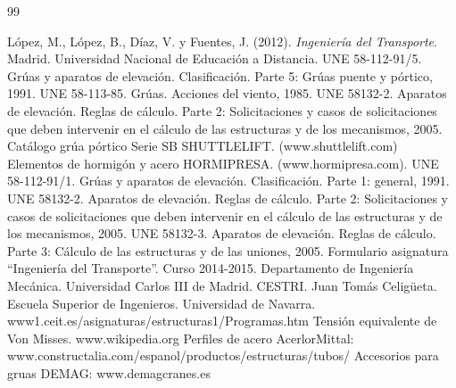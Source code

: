 \documentclass[11pt,oneside,a4paper]{report}
\begin{document}
\begin{thebibliography} {99}

 López, M., López, B., Díaz, V. y Fuentes, J. (2012). \emph{Ingeniería del Transporte}. Madrid. Universidad Nacional de Educación a Distancia.
 UNE 58-112-91/5. Grúas y aparatos de elevación. Clasificación. Parte 5: Grúas puente y pórtico, 1991.
 UNE 58-113-85. Grúas. Acciones del viento, 1985.
 UNE 58132-2. Aparatos de elevación. Reglas de cálculo. Parte 2: Solicitaciones y casos de solicitaciones que deben intervenir en el cálculo de las estructuras y de los mecanismos, 2005.
 Catálogo grúa pórtico Serie SB SHUTTLELIFT. (www.shuttlelift.com)
 Elementos de hormigón y acero HORMIPRESA. (www.hormipresa.com).
 UNE 58-112-91/1. Grúas y aparatos de elevación. Clasificación. Parte 1: general, 1991.
 UNE 58132-2. Aparatos de elevación. Reglas de cálculo. Parte 2: Solicitaciones y casos de solicitaciones que deben intervenir en el cálculo de las estructuras y de los mecanismos, 2005.
  UNE 58132-3. Aparatos de elevación. Reglas de cálculo. Parte 3: Cálculo de las estructuras y de las uniones, 2005.
 Formulario asignatura ``Ingeniería del Transporte''. Curso 2014-2015. Departamento de Ingeniería Mecánica. Universidad Carlos III de Madrid.
 CESTRI. Juan Tomás Celigüeta. Escuela Superior de Ingenieros. Universidad de Navarra.
www1.ceit.es/asignaturas/estructuras1/Programas.htm
 Tensión equivalente de Von Misses. www.wikipedia.org
 Perfiles de acero AcerlorMittal:     www.constructalia.com/espanol/productos/estructuras/tubos/
 Accesorios para gruas DEMAG: www.demagcranes.es
\end{thebibliography}
\end{document}
